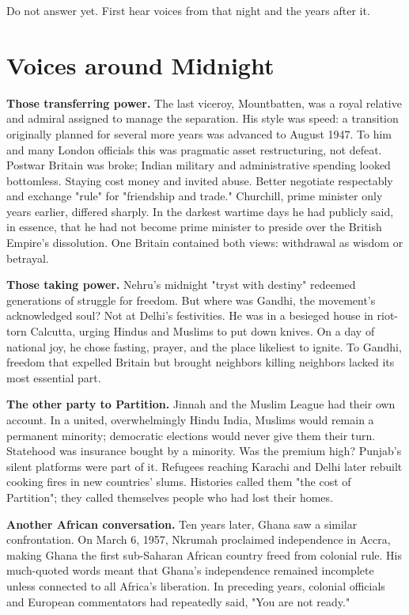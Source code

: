 Do not answer yet. First hear voices from that night and the years after it.

\section{Voices around Midnight}
\textbf{Those transferring power.} The last viceroy, Mountbatten, was a royal relative and admiral assigned to manage the separation. His style was speed: a transition originally planned for several more years was advanced to August 1947. To him and many London officials this was pragmatic asset restructuring, not defeat. Postwar Britain was broke; Indian military and administrative spending looked bottomless. Staying cost money and invited abuse. Better negotiate respectably and exchange "rule" for "friendship and trade." Churchill, prime minister only years earlier, differed sharply. In the darkest wartime days he had publicly said, in essence, that he had not become prime minister to preside over the British Empire's dissolution. One Britain contained both views: withdrawal as wisdom or betrayal.

\textbf{Those taking power.} Nehru's midnight "tryst with destiny" redeemed generations of struggle for freedom. But where was Gandhi, the movement's acknowledged soul? Not at Delhi's festivities. He was in a besieged house in riot-torn Calcutta, urging Hindus and Muslims to put down knives. On a day of national joy, he chose fasting, prayer, and the place likeliest to ignite. To Gandhi, freedom that expelled Britain but brought neighbors killing neighbors lacked its most essential part.

\textbf{The other party to Partition.} Jinnah and the Muslim League had their own account. In a united, overwhelmingly Hindu India, Muslims would remain a permanent minority; democratic elections would never give them their turn. Statehood was insurance bought by a minority. Was the premium high? Punjab's silent platforms were part of it. Refugees reaching Karachi and Delhi later rebuilt cooking fires in new countries' slums. Histories called them "the cost of Partition"; they called themselves people who had lost their homes.

\textbf{Another African conversation.} Ten years later, Ghana saw a similar confrontation. On March 6, 1957, Nkrumah proclaimed independence in Accra, making Ghana the first sub-Saharan African country freed from colonial rule. His much-quoted words meant that Ghana's independence remained incomplete unless connected to all Africa's liberation. In preceding years, colonial officials and European commentators had repeatedly said, "You are not ready."

